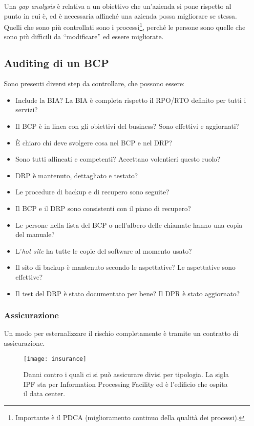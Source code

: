 Una \textit{gap analysis} è relativa a un obiettivo che un'azienda si pone
rispetto al punto in cui è, ed è necessaria affinché una azienda possa
migliorare se stessa. Quelli che sono più controllati sono i
processi\footnote{Importante è il PDCA (miglioramento continuo della qualità
dei processi).}, perché le persone sono quelle che sono più difficili da
``modificare'' ed essere migliorate.

\subsection{Auditing di un BCP}

Sono presenti diversi step da controllare, che possono essere:
\begin{itemize}
  \item Include la BIA? La BIA è completa rispetto il RPO/RTO definito per
  tutti i servizi?
  \item Il BCP è in linea con gli obiettivi del business? Sono effettivi e
  aggiornati?
  \item È chiaro chi deve svolgere cosa nel BCP e nel DRP?
  \item Sono tutti allineati e competenti? Accettano volentieri questo ruolo?
  \item DRP è mantenuto, dettagliato e testato?
  \item Le procedure di backup e di recupero sono seguite?
  \item Il BCP e il DRP sono consistenti con il piano di recupero?
  \item Le persone nella lista del BCP o nell'albero delle chiamate hanno una
  copia del manuale?
  \item L'\textit{hot site} ha tutte le copie del software al momento usato?
  \item Il sito di backup è mantenuto secondo le aspettative? Le
  aspettative sono effettive?
  \item Il test del DRP è stato documentato per bene? Il DPR è stato
  aggiornato?
\end{itemize}

\subsubsection{Assicurazione}

Un modo per esternalizzare il rischio completamente è tramite un contratto di
assicurazione.

\begin{figure}[H]
\centering
\texttt{[image: insurance]}
\caption[Danni contro i quali ci si può assicurare divisi per
tipologia]{Danni contro i quali ci si può assicurare divisi per
tipologia. La sigla IPF sta per Information Processing Facility
ed è l'edificio che ospita il data center.}
\label{fig:insurance}
\end{figure}


